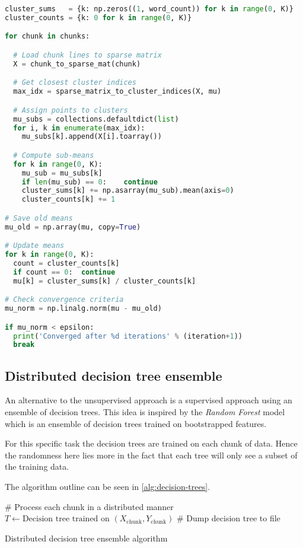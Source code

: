 \begin{lstlisting}[language=python]
cluster_sums   = {k: np.zeros((1, word_count)) for k in range(0, K)}
cluster_counts = {k: 0 for k in range(0, K)}

for chunk in chunks:

  # Load chunk lines to sparse matrix
  X = chunk_to_sparse_mat(chunk)

  # Get closest cluster indices
  max_idx = sparse_matrix_to_cluster_indices(X, mu)

  # Assign points to clusters
  mu_subs = collections.defaultdict(list)
  for i, k in enumerate(max_idx):
    mu_subs[k].append(X[i].toarray())

  # Compute sub-means
  for k in range(0, K):
    mu_sub = mu_subs[k]
    if len(mu_sub) == 0:    continue
    cluster_sums[k] += np.asarray(mu_sub).mean(axis=0)
    cluster_counts[k] += 1

# Save old means
mu_old = np.array(mu, copy=True)

# Update means
for k in range(0, K):
  count = cluster_counts[k]
  if count == 0:  continue
  mu[k] = cluster_sums[k] / cluster_counts[k]

# Check convergence criteria
mu_norm = np.linalg.norm(mu - mu_old)

if mu_norm < epsilon:
  print('Converged after %d iterations' % (iteration+1))
  break
\end{lstlisting}

\subsection{Distributed decision tree ensemble}

An alternative to the unsupervised approach is a supervised approach using
an ensemble of decision trees. This idea is inspired by the
\textit{Random Forest} model which is an ensemble of decision trees trained on
bootstrapped features.

For this specific task the decision trees are trained on each chunk of data.
Hence the randomness here lies more in the fact that each tree will only see
a subset of the training data.

The algorithm outline can be seen in \cref{alg:decision-trees}.

\begin{algorithm}[H]
  \begin{algorithmic}[1]

    \State \# Process each chunk in a distributed manner
      \State $T \gets \text{Decision tree trained on } (X_\text{chunk}, Y_\text{chunk})$
      \State \# Dump decision tree to file
    \EndFor

  \end{algorithmic}
  \caption{Distributed decision tree ensemble algorithm}
  \label{alg:decision-trees}
\end{algorithm}

